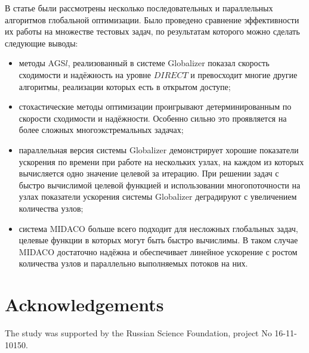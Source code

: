 \documentclass{svproc}
\begin{document}
\begin{Russian}
В статье были рассмотрены несколько последовательных и параллельных алгоритмов глобальной оптимизации.
Было проведено сравнение эффективности их работы на множестве тестовых задач, по результатам которого можно сделать
следующие выводы:
\begin{itemize}
  \item методы AGS\(l\), реализованный в системе Globalizer показал скорость сходимости и надёжность на уровне \(DIRECT\) и
  превосходит многие другие алгоритмы, реализации которых есть в открытом доступе;
  \item стохастические методы оптимизации проигрывают детерминированным по скорости сходимости и надёжности. Особенно
  сильно это проявляется на более сложных многоэкстремальных задачах;
  \item параллельная версия системы Globalizer демонстрирует хорошие показатели ускорения по времени при работе на нескольких узлах,
  на каждом из которых вычисляется одно значение целевой за итерацию. При решении задач с быстро вычислимой целевой функцией и
  использовании многопоточности на узлах показатели ускорения системы Globalizer деградируют с увеличением количества узлов;
  \item система MIDACO больше всего подходит для несложных глобальных задач, целевые функции в которых могут быть быстро вычислимы.
  В таком случае MIDACO достаточно надёжна и обеспечивает линейное ускорение с ростом количества узлов и параллельно выполняемых потоков на них.
\end{itemize}

\end{Russian}

\section*{Acknowledgements}
The study was supported by the Russian Science Foundation, project No 16-11-
10150.

%

{}
\end{document}
